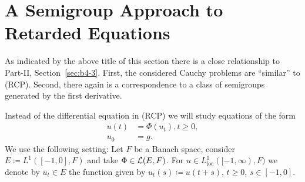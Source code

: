 \newpage
\section{A Semigroup Approach to Retarded Equations}\label{sec:c4-3}
%
%
%
\hspace{1cm}{\Large by Annette Grabosch and Ulrich Moustakas}
\vspace{.5cm}
\newline
{}
As indicated by the above title of this section there is a close relationship to Part-II, Section~\ref{sec:b4-3}.
First, the considered Cauchy problems are \enquote{similar} to (RCP).
Second, there again is a correspondence to a class of semigroups generated by the first derivative.

Instead of the differential equation in (RCP) we will study equations of the form
\begin{equation*}\label{eq:c4-re} \tag{RE}
\begin{split} 
u(t) &= \Phi(u_t),  t \geq 0,\\
u_0 &= g.
\end{split}
\end{equation*}
We use the following setting: Let $F$ be a Banach space, consider $E \coloneq L^{1}([-1,0],F)$ and take $\Phi \in \mathcal{L}(E,F)$.
For $u \in L^{1}_{\mathrm{loc}}([-1,\infty),F)$ we denote by $u_t \in E$ the function given by $u_t(s) \coloneq u(t+s)$, $t \geq 0$, $s \in [-1,0]$.

